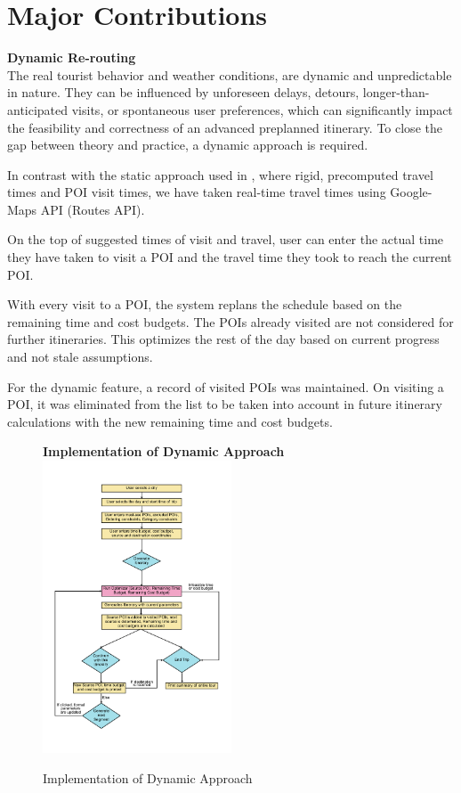 \documentclass[sigconf,authordraft]{acmart}
\begin{document}
\section{Major Contributions}
\textbf{Dynamic Re-routing}\\
The real tourist behavior and weather conditions, are dynamic and unpredictable in nature. They can be influenced by unforeseen delays, detours, longer-than-anticipated visits, or spontaneous user preferences, which can significantly impact the feasibility and correctness of an advanced preplanned itinerary. To close the gap between theory and practice, a dynamic approach is required.

In contrast with the static approach used in \cite{taylor2018tour}, where rigid, precomputed travel times and POI visit times, we have taken real-time travel times using Google-Maps API (Routes API). 

On the top of suggested times of visit and travel, user can enter the actual time they have taken to visit a POI and the travel time they took to reach the current POI.

With every visit to a POI, the system replans the schedule based on the remaining time and cost budgets. The POIs already visited are not considered for further itineraries. This optimizes the rest of the day based on current progress and not stale assumptions.

For the dynamic feature, a record of visited POIs was maintained. On visiting a POI, it was eliminated from the list to be taken into account in future itinerary calculations with the new remaining time and cost budgets.

\begin{figure}[H]
\textbf{Implementation of Dynamic Approach}
\centering
\includegraphics[width=0.5\textwidth]{binary dynamic flowchart.png}
\caption{Implementation of Dynamic Approach}
\label{fig:flowchart_dynamic}
\end{figure}
\end{document}
